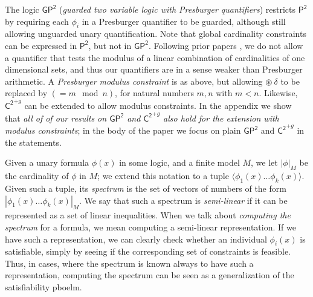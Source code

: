 \documentclass[10pt,a4paper]{article}
\theoremstyle{definition}
\theoremstyle{remark}
\newcommand{\Ctwo}    {\mathsf{C^2}}
\newcommand{\Ctwoplusglobal} { \Ctwo^{+g}}
\newcommand{\Ptwo}    {\mathsf{P^2}}
\newcommand{\GPtwo}   {\mathsf{GP^2}}
\begin{document}
The logic $\GPtwo$ (\emph{guarded two variable logic with Presburger quantifiers}) restricts $\Ptwo$ by requiring each $\phi_i$ in a Presburger quantifier to be guarded, although still allowing unguarded unary quantification.
Note that global cardinality constraints can be expressed in $\Ptwo$, but not in $\GPtwo$.
Following prior papers \cite{twovarpres}, we do not allow a quantifier that tests the modulus of a linear combination of
cardinalities of one dimensional sets, and thus our quantifiers are in a sense weaker than Presburger arithmetic.
A \emph{Presburger modulus constraint} is as above, but allowing $\circledast\ \delta$ to be replaced by 
$(= m \mod n)$, for natural numbers $m, n$ with $m < n$.
Likewise, $\Ctwoplusglobal$ can be extended to allow modulus constraints. 
In the appendix we show that \emph{all of of our results on $\GPtwo$ and $\Ctwoplusglobal$ also hold for the extension with modulus constraints}; in the body of the paper we focus on plain $\GPtwo$ and $\Ctwoplusglobal$ in the statements. 


Given a unary formula $\phi(x)$ in some logic, and a finite model $M$, we let $|\phi|_M$ be the cardinality of $\phi$ in $M$; we extend this notation to a tuple $\langle \phi_1(x) \ldots \phi_k(x) \rangle$.
Given such a tuple, its \emph{spectrum} is the set of vectors of numbers of the form  $| \phi_1(x) \ldots \phi_k(x) |_M$. We say that such a spectrum is \emph{semi-linear} if it can be represented as a set of linear inequalities. When we talk about \emph{computing the spectrum} for a formula, we mean computing a semi-linear representation. 
If we have such a representation, we can clearly check whether an individual $\phi_i(x)$ is satisfiable, simply by seeing if the corresponding set of constraints is feasible. Thus, in cases, where the spectrum is known always to have such a representation, computing the spectrum can be seen as a generalization of the satisfiability pboelm.
\end{document}
